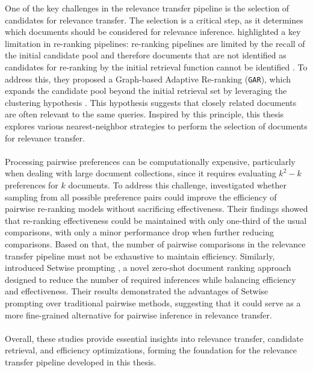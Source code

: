 One of the key challenges in the relevance transfer pipeline is the selection of candidates for relevance transfer. The selection is a critical step, as it determines which documents should be considered for relevance inference. \mbox{\citet{macavaney:2022}} highlighted a key limitation in re-ranking pipelines: \glqq re-ranking pipelines are limited by the recall of the initial candidate pool and therefore documents that are not identified as candidates for re-ranking by the initial retrieval function cannot be identified \grqq{}. To address this, they proposed a Graph-based Adaptive Re-ranking (\texttt{GAR}), which expands the candidate pool beyond the initial retrieval set by leveraging the clustering hypothesis \citep{jardine:1971}. This hypothesis suggests that closely related documents are often relevant to the same queries. Inspired by this principle, this thesis explores various nearest-neighbor strategies to perform the selection of documents for relevance transfer.
\\\\
Processing pairwise preferences can be computationally expensive, particularly when dealing with large document collections, since it requires evaluating $k^2-k$ preferences for $k$ documents. To address this challenge, \mbox{\citet{gienapp:2022}} investigated whether sampling from all possible preference pairs could improve the efficiency of pairwise re-ranking models without sacrificing effectiveness. Their findings showed that re-ranking effectiveness could be maintained with only one-third of the usual comparisons, with only a minor performance drop when further reducing comparisons. Based on that, the number of pairwise comparisons in the relevance transfer pipeline must not be exhaustive to maintain efficiency. Similarly, \citet{zhuang:2024} introduced \glqq Setwise prompting \grqq{}, a novel zero-shot document ranking approach designed to reduce the number of required inferences while balancing efficiency and effectiveness. Their results demonstrated the advantages of Setwise prompting over traditional pairwise methods, suggesting that it could serve as a more fine-grained alternative for pairwise inference in relevance transfer.
\\\\
Overall, these studies provide essential insights into relevance transfer, candidate retrieval, and efficiency optimizations, forming the foundation for the relevance transfer pipeline developed in this thesis.

